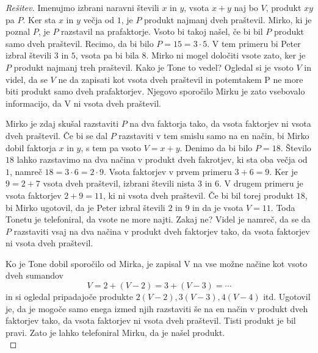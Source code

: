 \documentclass{amsart}
\begin{document}
\begin{proof}[Rešitev]
    Imenujmo izbrani naravni števili $x$ in $y$, vsota $x+y$ naj bo $V$, produkt $xy$ pa $P$. Ker sta $x$ in $y$ večja od $1$, 
    je $P$ produkt najmanj dveh praštevil. Mirko, ki je poznal $P$, je $P$ razstavil na prafaktorje. Vsoto bi takoj našel, če 
    bi bil $P$ produkt samo dveh praštevil. Recimo, da bi bilo $P = 15 = 3 \cdot 5$. V tem primeru bi Peter izbral števili $3$ 
    in $5$, vsota pa bi bila $8$. Mirko ni mogel določiti vsote zato, ker je $P$ produkt najmanj treh praštevil. Kako je Tone 
    to vedel? Ogledal si je vsoto $V$ in videl, da se $V$ ne da zapisati kot vsota dveh praštevil in potemtakem P ne more biti 
    produkt samo dveh prafaktorjev. Njegovo sporočilo Mirku je zato vsebovalo informacijo, da V ni vsota dveh praštevil.

    Mirko je zdaj skušal razstaviti $P$ na dva faktorja tako, da vsota faktorjev ni vsota dveh praštevil. Če bi se dal $P$ 
    razstaviti v tem smislu samo na en način, bi Mirko dobil faktorja $x$ in $y$, s tem pa vsoto $V = x+y$. Denimo da bi bilo 
    $P = 18$. Število $18$ lahko razstavimo na dva načina v produkt dveh fakrotjev, ki sta oba večja od $1$, namreč $18 = 3 
    \cdot 6= 2 \cdot 9$. Vsota faktorjev v prvem primeru $3+6=9$. Ker je $9 = 2+7$ vsota dveh praštevil, izbrani števili nista 
    $3$ in $6$. V drugem primeru je vsota faktorjev $2+9 = 11$, ki ni vsota dveh praštevil. Če bi bil torej produkt $18$, bi 
    Mirko ugotovil, da je Peter izbral števili $2$ in $9$ in da je vsota $V = 11$. Toda Tonetu je telefoniral, da vsote ne more 
    najti. Zakaj ne? Videl je namreč, da se da $P$ razstaviti vsaj na dva načina v produkt dveh faktorjev tako, da vsota 
    faktorjev ni vsota dveh praštevil. 
    
    Ko je Tone dobil sporočilo od Mirka, je zapisal V na vse možne načine kot vsoto dveh sumandov
    \[V = 2+(V-2)= 3+(V-3)= \cdots\]
    in si ogledal pripadajoče produkte  $2(V-2), 3(V-3), 4(V-4)$ itd. Ugotovil je, da je mogoče samo enega izmed njih razstaviti 
    še na en način v produkt dveh faktorjev tako, da vsota faktorjev ni vsota dveh praštevil. Tisti produkt je bil pravi. Zato je 
    lahko telefoniral Mirku, da je našel produkt.\\


\end{proof}
\end{document}
